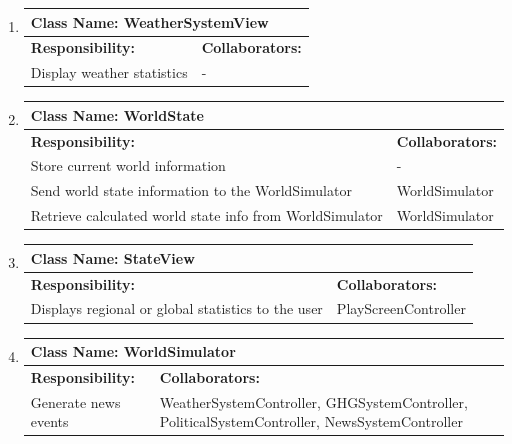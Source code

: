\documentclass[]{article}
\begin{document}
\begin{enumerate}[1.]
\begin{tabular}{|p{10cm}|p{4cm}|}
	    \hline
	  \end{tabular}

	\item
	\begin{tabular}{|p{10cm}|p{4cm}|}
	    \hline
	     \multicolumn{2}{|l|}{\textbf{Class Name:  WeatherSystemView}} \\
	    \hline
	    \textbf{Responsibility:} & \textbf{Collaborators:} \\
	    \hline
			Display weather statistics & - \\

	    \hline
	  \end{tabular}

	\item
	\begin{tabular}{|p{10cm}|p{4cm}|}
	    \hline
	     \multicolumn{2}{|l|}{\textbf{Class Name:  WorldState}} \\
	    \hline
	    \textbf{Responsibility:} & \textbf{Collaborators:} \\
	    \hline
	    Store current world information & - \\
	Send world state information to the WorldSimulator & WorldSimulator \\
	Retrieve calculated world state info from WorldSimulator & WorldSimulator \\

	    \hline
	  \end{tabular}

	\item
	\begin{tabular}{|p{10cm}|p{4cm}|}
	    \hline
	     \multicolumn{2}{|l|}{\textbf{Class Name:  StateView}} \\
	    \hline
	    \textbf{Responsibility:} & \textbf{Collaborators:} \\
	    \hline
			Displays regional or global statistics to the user & PlayScreenController \\

	    \hline
	  \end{tabular}

	\item
	\begin{tabular}{|p{10cm}|p{4cm}|}
	    \hline
	     \multicolumn{2}{|l|}{\textbf{Class Name:  WorldSimulator}} \\
	    \hline
	    \textbf{Responsibility:} & \textbf{Collaborators:} \\
	    \hline
	    Generate news events & WeatherSystemController, GHGSystemController, PoliticalSystemController, NewsSystemController \\

	    \hline
	  \end{tabular}


\end{enumerate}
\end{document}
